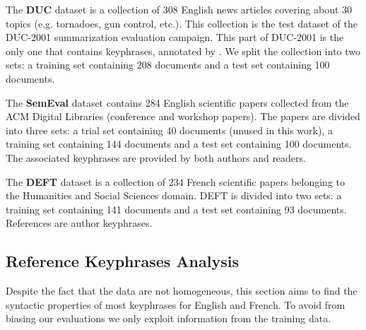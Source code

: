     The \textbf{DUC} dataset \cite{over2001duc} is a collection of 308 English
    news articles covering about 30 topics (e.g. tornadoes, gun control, etc.).
    This collection is the test dataset of the DUC-2001 summarization evaluation
    campaign. This part of DUC-2001 is the only one that contains keyphrases,
    annotated by . We split the collection into two
    sets: a training set containing 208 documents and a test set containing 100
    documents.

    The \textbf{SemEval} dataset \cite{kim2010semeval} contains 284 English
    scientific papers collected from the ACM Digital Libraries (conference and
    workshop papers). The papers are divided into three sets: a trial set
    containing 40 documents (unused in this work), a training set containing 144
    documents and a test set containing 100 documents. The associated keyphrases
    are provided by both authors and readers.

    The \textbf{DEFT} dataset \cite{Paroubek2012deft} is a collection of 234
    French scientific papers belonging to the Humanities and Social Sciences
    domain. DEFT is divided into two sets: a training set containing 141
    documents and a test set containing 93 documents. References are author
    keyphrases.

  \subsection{Reference Keyphrases Analysis}
  \label{subsec:keyphrase_analysis}
    Despite the fact that the data are not homogeneous, this section aims to
    find the syntactic properties of most keyphrases for English and French. To
    avoid from biasing our evaluations we only exploit information from the
    training data.

